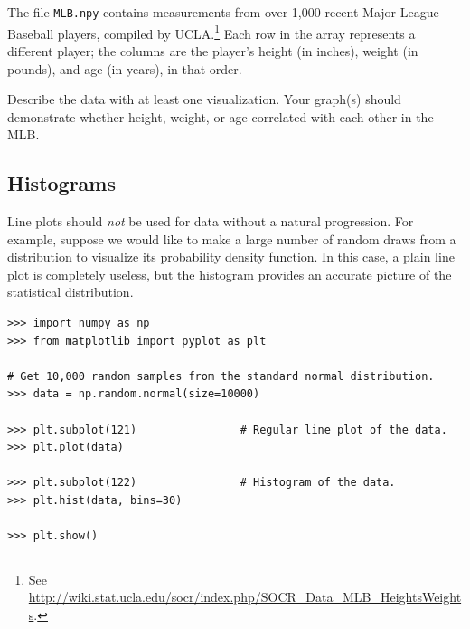 
\begin{problem} %
The file \texttt{MLB.npy} contains measurements from over 1,000 recent Major League Baseball players, compiled by UCLA.\footnote{See \url{http://wiki.stat.ucla.edu/socr/index.php/SOCR_Data_MLB_HeightsWeights}.}
Each row in the array represents a different player; the columns are the player's height (in inches), weight (in pounds), and age (in years), in that order.

Describe the data with at least one visualization.
Your graph(s) should demonstrate whether height, weight, or age correlated with each other in the MLB.
\end{problem}

\subsection*{Histograms} %

Line plots should \emph{not} be used for data without a natural progression.
For example, suppose we would like to make a large number of random draws from a distribution to visualize its probability density function.
In this case, a plain line plot is completely useless, but the histogram provides an accurate picture of the statistical distribution.

\begin{lstlisting}
>>> import numpy as np
>>> from matplotlib import pyplot as plt

# Get 10,000 random samples from the standard normal distribution.
>>> data = np.random.normal(size=10000)

>>> plt.subplot(121)                # Regular line plot of the data.
>>> plt.plot(data)

>>> plt.subplot(122)                # Histogram of the data.
>>> plt.hist(data, bins=30)

>>> plt.show()
\end{lstlisting}

